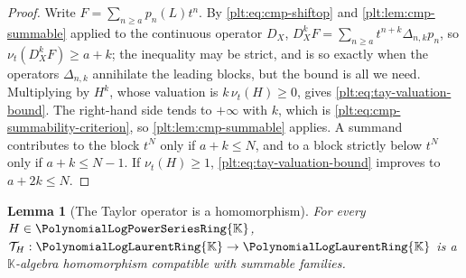 \documentclass[11pt,oneside]{article}
\theoremstyle{plain}
\newtheorem{lemma}[theorem]{Lemma}
\theoremstyle{definition}
\theoremstyle{remark}
\newcommand{\K}{\mathbb{K}}
\newcommand{\PLpow}{\PolynomialLogPowerSeriesRing{\K}}   %
\newcommand{\PLlau}{\PolynomialLogLaurentRing{\K}}       %
\newcommand{\ordt}{\nu_{t}}                              %
\newcommand{\DX}{D_{X}}                                  %
\newcommand{\shiftop}[2]{\Delta_{#1,#2}}                 %
\begin{document}
\begin{proof}
Write \(F=\sum_{n\ge a}p_n(L)t^n\).  By \eqref{plt:eq:cmp-shiftop} and
\cref{plt:lem:cmp-summable} applied to the continuous operator \(\DX\),
\(\DX^{k}F=\sum_{n\ge a}t^{n+k}\shiftop{n}{k}p_n\), so
\(\ordt(\DX^{k}F)\ge a+k\); the inequality may be strict, and is so exactly
when the operators \(\shiftop{n}{k}\) annihilate the leading blocks, but the
bound is all we need.  Multiplying by \(H^{k}\), whose valuation is
\(k\,\ordt(H)\ge0\), gives \eqref{plt:eq:tay-valuation-bound}.  The right-hand
side tends to \(+\infty\) with \(k\), which is
\eqref{plt:eq:cmp-summability-criterion}, so
\cref{plt:lem:cmp-summable} applies.  A summand contributes to the block
\(t^{N}\) only if \(a+k\le N\), and to a block strictly below \(t^{N}\) only
if \(a+k\le N-1\).  If \(\ordt(H)\ge1\), \eqref{plt:eq:tay-valuation-bound}
improves to \(a+2k\le N\).
\end{proof}

\begin{lemma}[The Taylor operator is a homomorphism]
\label{plt:lem:tay-homomorphism}
For every \(H\in\PLpow\), \(\mathcal T_{H}:\PLlau\to\PLlau\) is a
\(\K\)-algebra homomorphism compatible with summable families.
\end{lemma}
\end{document}
